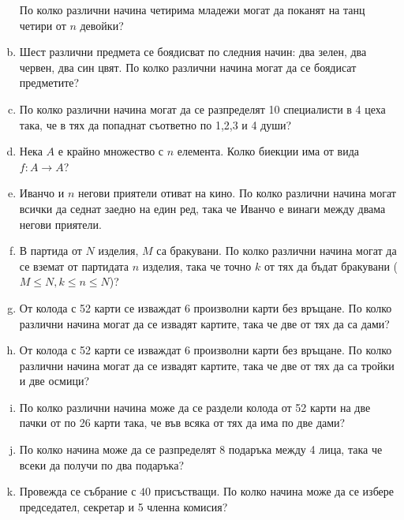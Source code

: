 \begin{problem}
\begin{enumerate}[a)]
    По колко различни начина четирима младежи могат да поканят на танц четири от $n$ девойки?
  \item
    Шест различни предмета се боядисват по следния начин: два зелен, два червен, два син цвят.
    По колко различни начина могат да се боядисат предметите?  
  \item
    По колко различни начина могат да се разпределят 10 специалисти в 4 цеха така, че в тях да попаднат съответно по 1,2,3 и 4 души?
  \item
    Нека $A$ е крайно множество с $n$ елемента. Колко биекции има от вида $f:A\to A$?
  \item
    Иванчо и $n$ негови приятели отиват на кино.
    По колко различни начина могат всички да седнат заедно на един ред, така че Иванчо е винаги
    между двама негови приятели.
  \item
    В партида от $N$ изделия, $M$ са бракувани.
    По колко различни начина могат да се вземат от партидата $n$ изделия, така че точно $k$ от тях да бъдат бракувани ($M\leq N, k\leq n\leq N$)?
  \item
    От колода с 52 карти се изваждат 6 произволни карти без връщане.
    По колко различни начина могат да се извадят картите, така че две от тях да са дами?
  \item
    От колода с 52 карти се изваждат 6 произволни карти без връщане.
    По колко различни начина могат да се извадят картите, така че две от тях да са тройки и две осмици?
  \item
    По колко различни начина може да се раздели колода от 52 карти на две пачки от по 26 карти така, че във всяка от тях да има по две дами?
  \item
    По колко начина може да се разпределят 8 подаръка между 4 лица, така че всеки да получи по два подаръка?
  \item
    Провежда се събрание с $40$ присъстващи.
    По колко начина може да се избере председател, секретар и 5 членна комисия?
  \end{enumerate}
\end{problem}


